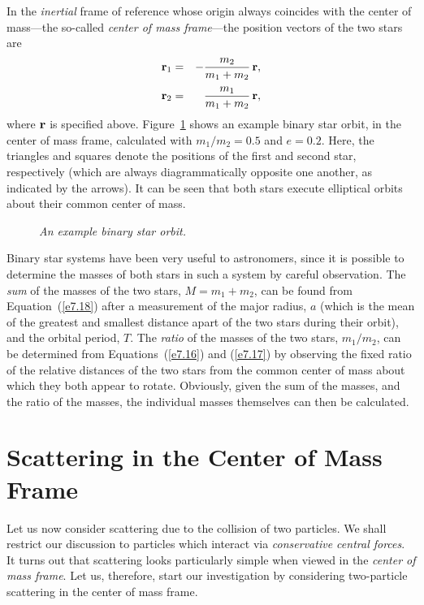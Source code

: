 In the {\em inertial}\/ frame of reference whose origin always coincides with the center of mass---the so-called {\em center of mass frame}---the position vectors of the two stars are
\begin{eqnarray}\label{e7.16}
{\bf r}_1 &=& -\frac{m_2}{m_1+m_2}\,{\bf r},\\[0.5ex]
{\bf r}_2 &=& \frac{m_1}{m_1+m_2}\,{\bf r},\label{e7.17}
\end{eqnarray}
where ${\bf r}$ is specified above. Figure~\ref{double} shows an example binary star orbit, in the center of mass frame, calculated with $m_1/m_2=0.5$
and $e=0.2$. Here, the triangles and squares denote the positions of the
first and second star, respectively (which are always diagrammatically opposite one another, as indicated by the arrows). It can be seen that both stars execute
elliptical orbits about their common center of mass.

\begin{figure}
\epsfysize=3in
\centerline{}
\caption{\em An example binary star orbit.}\label{double}
\end{figure}

Binary star systems have been very useful to astronomers, since it is
possible to determine the masses of both stars in such a system
by careful observation.
 The {\em sum}\/ of the masses of the two stars, $M=m_1+m_2$, can be found
from Equation~(\ref{e7.18}) after a measurement of the major radius, $a$ (which
is the mean of the greatest and smallest distance apart of the two
stars during their orbit), and the orbital period, $T$. The {\em ratio}\/ of the
masses of the two stars, $m_1/m_2$,  can be determined from Equations~(\ref{e7.16}) and (\ref{e7.17}) by
observing the fixed ratio of the relative distances of the two stars from the common
center of mass about which they both appear to rotate. Obviously, given the sum
of the masses, and the ratio of the masses, the individual masses themselves can
then be calculated.

\section{Scattering in the Center of Mass Frame}\label{cofm}
Let us now consider scattering due to the collision of two particles. We shall
restrict our discussion to particles which interact via {\em conservative central
forces}. It turns out that scattering looks particularly simple when
viewed in the {\em  center of mass frame}. Let us, therefore, start our investigation
by considering two-particle scattering in the center of mass frame.

